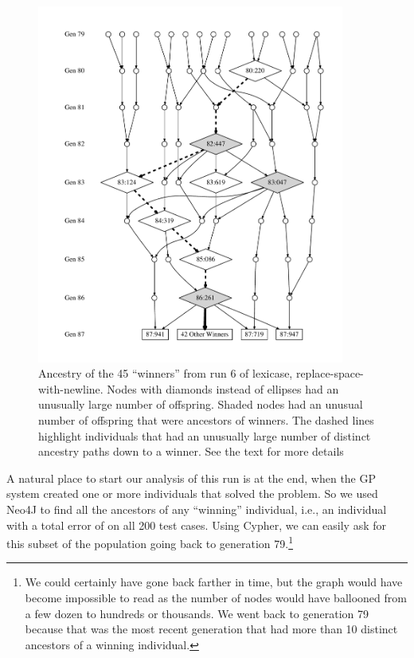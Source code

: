 \begin{figure}[tp]
	\begin{center}
	\includegraphics[width=0.9\textwidth]{figures/ancestors_of_winners_colons.pdf}
	\end{center}
	\caption{Ancestry of the 45 ``winners'' from run 6 of lexicase, replace-space-with-newline. Nodes
		with diamonds instead of ellipses had an unusually large number of offspring. Shaded nodes
		had an unusual number of offspring that were ancestors of winners. The dashed lines highlight
		individuals that had an unusually large number of distinct ancestry paths down to a winner.
		See the text for more details}
	\label{fig:winnerAncestors}
\end{figure}

A natural place to start our analysis of this run is at the end, when the GP system created one or more individuals that 
solved the problem. So we used Neo4J to find all the ancestors of any ``winning'' individual, i.e., an individual with a total error of 
on all 200 test cases. Using Cypher, we can easily ask for this subset
of the population going back to generation 79.\footnote{We could certainly 
	have gone back farther in time, but the graph would have become impossible to read as the
	number of nodes would have ballooned from a few dozen to hundreds or thousands. We went
	back to generation 79 because that was the most recent generation that had more than 10
	distinct ancestors of a winning individual.}

